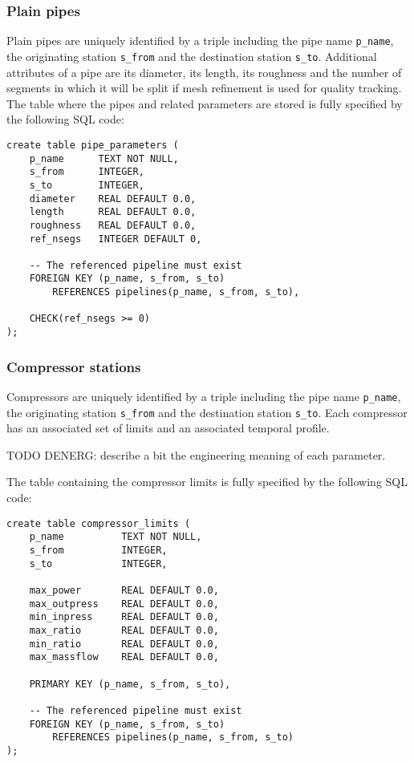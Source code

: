 \subsubsection{Plain pipes}
Plain pipes are uniquely identified by a triple including the pipe
name \texttt{p\_name}, the originating station \texttt{s\_from} and the destination
station \texttt{s\_to}. Additional attributes of a pipe are its diameter,
its length, its roughness and the number of segments in which it will be split
if mesh refinement is used for quality tracking. The table where the pipes and
related parameters are stored is fully specified by the following SQL code:
\begin{verbatim}
create table pipe_parameters (
    p_name      TEXT NOT NULL,
    s_from      INTEGER,
    s_to        INTEGER,
    diameter    REAL DEFAULT 0.0,
    length      REAL DEFAULT 0.0,
    roughness   REAL DEFAULT 0.0,
    ref_nsegs   INTEGER DEFAULT 0,

    -- The referenced pipeline must exist
    FOREIGN KEY (p_name, s_from, s_to)
        REFERENCES pipelines(p_name, s_from, s_to),

    CHECK(ref_nsegs >= 0)
);
\end{verbatim}
\subsubsection{Compressor stations}
Compressors are uniquely identified by a triple including the pipe
name \texttt{p\_name}, the originating station \texttt{s\_from} and the destination
station \texttt{s\_to}. Each compressor has an associated set of limits and an
associated temporal profile.

TODO DENERG: describe a bit the engineering meaning of each parameter.

The table containing the compressor limits is fully specified by the following
SQL code:
\begin{verbatim}
create table compressor_limits (
    p_name          TEXT NOT NULL,
    s_from          INTEGER,
    s_to            INTEGER,

    max_power       REAL DEFAULT 0.0,
    max_outpress    REAL DEFAULT 0.0,
    min_inpress     REAL DEFAULT 0.0,
    max_ratio       REAL DEFAULT 0.0,
    min_ratio       REAL DEFAULT 0.0,
    max_massflow    REAL DEFAULT 0.0,

    PRIMARY KEY (p_name, s_from, s_to),

    -- The referenced pipeline must exist
    FOREIGN KEY (p_name, s_from, s_to)
        REFERENCES pipelines(p_name, s_from, s_to)
);
\end{verbatim}

